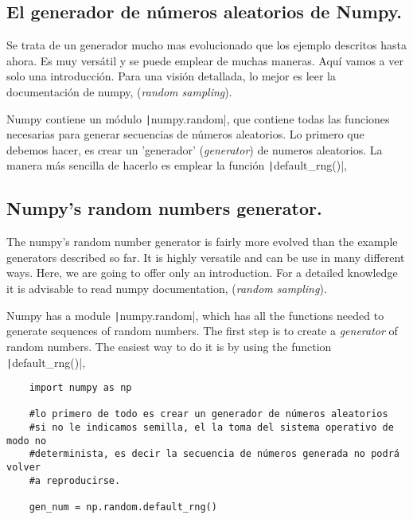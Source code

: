 \begin{paracol}{2}
\subsection{El generador de números aleatorios de Numpy.}\label{rand} Se trata de un generador mucho mas evolucionado que los ejemplo descritos hasta ahora. Es muy versátil y se puede emplear de muchas maneras. Aquí vamos a ver solo una introducción. Para una visión detallada, lo mejor es leer la documentación de numpy, (\emph{random sampling}).

Numpy contiene un módulo  \texttt|numpy.random|, que contiene todas las funciones necesarias para generar secuencias de números aleatorios. Lo primero que debemos hacer, es crear un 'generador' (\emph{generator}) de numeros aleatorios. La manera más sencilla de hacerlo es emplear la función \texttt|default_rng()|,

\switchcolumn
\subsection{Numpy's random numbers generator.} The numpy's random number generator is fairly more evolved than the example generators described so far. It is highly versatile and can be use in many different ways. Here, we are going to offer only an introduction. For a detailed knowledge it is advisable to read numpy documentation, (\emph{random sampling}).

Numpy has a module \texttt|numpy.random|, which has all the functions needed to generate sequences of random numbers. The first step is to create a \emph{generator} of random numbers. The easiest way to do it is by using the function \texttt|default_rng()|,  
\end{paracol}
\begin{verbatim}
	import numpy as np
	
	#lo primero de todo es crear un generador de números aleatorios
	#si no le indicamos semilla, el la toma del sistema operativo de modo no
	#determinista, es decir la secuencia de números generada no podrá volver 
	#a reproducirse.
	
	gen_num = np.random.default_rng()
\end{verbatim}
 
